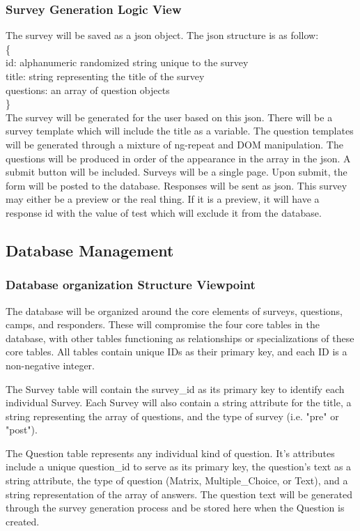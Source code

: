 \documentclass[letterpaper,10pt,serif, draftclsnofoot,onecolumn, compsoc, titlepage]{IEEEtran}
\begin{document}
\subsubsection{Survey Generation Logic View}
The survey will be saved as a json object. The json structure is as follow:\\
\{\\
\indent id: alphanumeric randomized string unique to the survey\\
\indent title: string representing the title of the survey\\
\indent questions: an array of question objects\\
\}\\
The survey will be generated for the user based on this json. There will be a survey template which will include the title as a variable.
The question templates will be generated through a mixture of ng-repeat and DOM manipulation. The questions will be produced in 
order of the appearance in the array in the json. A submit button will be included. Surveys will be a single page. Upon submit, the form will be posted to the database. Responses will be sent as json. This survey may either be a preview or the real thing. If it is a 
preview, it will have a response id with the value of test which will exclude it from the database.

\subsection{Database Management}
\subsubsection{Database organization Structure Viewpoint}
The database will be organized around the core elements of surveys, questions, camps, and responders.
These will compromise the four core tables in the database, with other tables functioning as relationships or specializations of these core tables.
All tables contain unique IDs as their primary key, and each ID is a non-negative integer.

The Survey table will contain the survey\_id as its primary key to identify each individual Survey.
Each Survey will also contain a string attribute for the title, a string representing the array of questions, and the type of survey (i.e. "pre" or "post").

The Question table represents any individual kind of question.
It's attributes include a unique question\_id to serve as its primary key, the question's text as a string attribute, the type of question (Matrix, Multiple\_Choice, or Text), and a string representation of the array of answers.
The question text will be generated through the survey generation process and be stored here when the Question is created.
\end{document}
